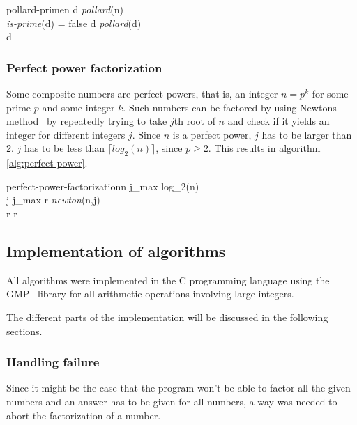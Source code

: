 \begin{pseudocode}{pollard-prime}{n}
\label{alg:pollard-prime}
d \GETS \textit{pollard}(n) \\
\WHILE \textit{is-prime}(d) = false \DO
    d \GETS \textit{pollard}(d) \\
\RETURN d
\end{pseudocode}

\subsubsection{Perfect power factorization}
Some composite numbers are perfect powers, that is, an integer $n = p^k$ for
some prime $p$ and some integer $k$. Such numbers can be factored by using
Newtons method~\cite{wiki:newton} by repeatedly trying to take $j$th root of
$n$ and check if it yields an integer for different integers $j$.
Since $n$ is a perfect power, $j$ has to be larger than 2.
$j$ has to be less than $\lceil log_2(n) \rceil$, 
since $p \geq 2$. This results in algorithm
\ref{alg:perfect-power}.

\begin{pseudocode}{perfect-power-factorization}{n}
\label{alg:perfect-power}
j_{max} \GETS \lceil log_2(n) \rceil \\
\FOR j \GETS j_{max}  \DO
\BEGIN
    r \GETS \textit{newton}(n,j) \\
    \IF r \in {} \THEN
        \RETURN r
\END
\end{pseudocode}

\subsection{Implementation of algorithms}
\label{sec:implementation-of-algorithms}
All algorithms were implemented in the C programming language using the
GMP~\cite{gmp}
library for all arithmetic operations involving large integers.

The different parts of the implementation will be discussed in
the following sections. 

\subsubsection{Handling failure}
\label{sec:handling-failure}

Since it might be the case that the program won't be able to factor all the
given numbers and an answer has to be given for all
numbers, a way was needed to abort the factorization of a number.

